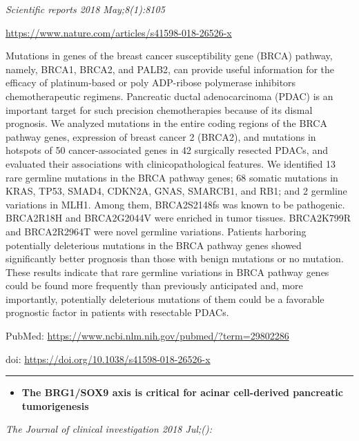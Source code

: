 \documentclass[]{article}
\providecommand{\tightlist}{%
  \setlength{\itemsep}{0pt}\setlength{\parskip}{0pt}}
\begin{document}
\emph{Scientific reports 2018 May;8(1):8105}

\url{https://www.nature.com/articles/s41598-018-26526-x}

Mutations in genes of the breast cancer susceptibility gene (BRCA)
pathway, namely, BRCA1, BRCA2, and PALB2, can provide useful information
for the efficacy of platinum-based or poly ADP-ribose polymerase
inhibitors chemotherapeutic regimens. Pancreatic ductal adenocarcinoma
(PDAC) is an important target for such precision chemotherapies because
of its dismal prognosis. We analyzed mutations in the entire coding
regions of the BRCA pathway genes, expression of breast cancer 2
(BRCA2), and mutations in hotspots of 50 cancer-associated genes in 42
surgically resected PDACs, and evaluated their associations with
clinicopathological features. We identified 13 rare germline mutations
in the BRCA pathway genes; 68 somatic mutations in KRAS, TP53, SMAD4,
CDKN2A, GNAS, SMARCB1, and RB1; and 2 germline variations in MLH1. Among
them, BRCA2S2148fs was known to be pathogenic. BRCA2R18H and BRCA2G2044V
were enriched in tumor tissues. BRCA2K799R and BRCA2R2964T were novel
germline variations. Patients harboring potentially deleterious
mutations in the BRCA pathway genes showed significantly better
prognosis than those with benign mutations or no mutation. These results
indicate that rare germline variations in BRCA pathway genes could be
found more frequently than previously anticipated and, more importantly,
potentially deleterious mutations of them could be a favorable
prognostic factor in patients with resectable PDACs.

PubMed: \url{https://www.ncbi.nlm.nih.gov/pubmed/?term=29802286}

doi: \url{https://doi.org/10.1038/s41598-018-26526-x}

{}

{}

\begin{center}\rule{0.5\linewidth}{\linethickness}\end{center}

\begin{itemize}
\tightlist
\item
  \textbf{The BRG1/SOX9 axis is critical for acinar cell-derived
  pancreatic tumorigenesis}
\end{itemize}

\emph{The Journal of clinical investigation 2018 Jul;():}
\end{document}
